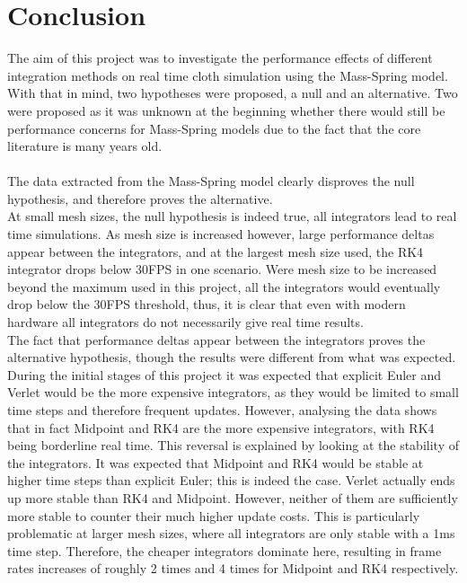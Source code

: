 \chapter{Conclusion}

The aim of this project was to investigate the performance effects of different integration methods on real time cloth simulation using the Mass-Spring model. With that in mind, two hypotheses were proposed, a null and an alternative. Two were proposed as it was unknown at the beginning whether there would still be performance concerns for Mass-Spring models due to the fact that the core literature is many years old.
\\\\The data extracted from the Mass-Spring model clearly disproves the null hypothesis, and therefore proves the alternative.
\\At small mesh sizes, the null hypothesis is indeed true, all integrators lead to real time simulations. As mesh size is increased however, large performance deltas appear between the integrators, and at the largest mesh size used, the RK4 integrator drops below 30FPS in one scenario. Were mesh size to be increased beyond the maximum used in this project, all the integrators would eventually drop below the 30FPS threshold, thus, it is clear that even with modern hardware all integrators do not necessarily give real time results. 
\\The fact that performance deltas appear between the integrators proves the alternative hypothesis, though the results were different from what was expected. During the initial stages of this project it was expected that explicit Euler and Verlet would be the more expensive integrators, as they would be limited to small time steps and therefore frequent updates. However, analysing the data shows that in fact Midpoint and RK4 are the more expensive integrators, with RK4 being borderline real time. This reversal is explained by looking at the stability of the integrators. It was expected that Midpoint and RK4 would be stable at higher time steps than explicit Euler; this is indeed the case. Verlet actually ends up more stable than RK4 and Midpoint. However, neither of them are sufficiently more stable to counter their much higher update costs. This is particularly problematic at larger mesh sizes, where all integrators are only stable with a 1ms time step. Therefore, the cheaper integrators dominate here, resulting in frame rates increases of roughly 2 times and 4 times for Midpoint and RK4 respectively.
